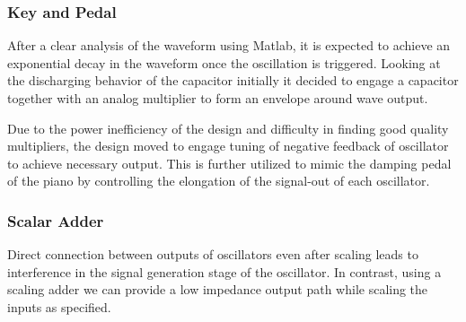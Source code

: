 \subsubsection{Key and Pedal}
After a clear analysis of the waveform using Matlab, it is expected to achieve an exponential decay in the waveform once the oscillation is triggered. Looking at the discharging behavior of the capacitor initially it decided to engage a capacitor together with an analog multiplier to form an envelope around wave output.
\par
Due to the power inefficiency of the design and difficulty in finding good quality multipliers, the design moved to engage tuning of negative feedback of oscillator to achieve necessary output. This is further utilized to mimic the damping pedal of the piano by controlling the elongation of the signal-out of each oscillator.
\subsubsection{Scalar Adder}
Direct connection between outputs of oscillators even after scaling leads to interference in the signal generation stage of the oscillator. In contrast, using a scaling adder we can provide a low impedance output path while scaling the inputs as specified.
